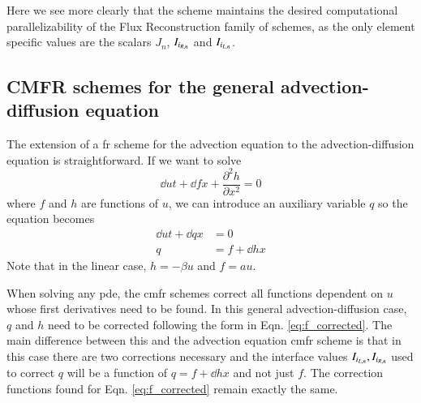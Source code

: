 Here we see more clearly that the scheme maintains the desired computational parallelizability of the Flux Reconstruction family of schemes, as the only element specific values are the scalars $J_n$, ${I_{i_{R,n}}}$ and ${I_{i_{L,n}}}$.

\subsection{CMFR schemes for the general advection-diffusion equation}
The extension of a \gls{fr} scheme for the advection equation to the advection-diffusion equation is straightforward. If we want to solve
\begin{equation}
\label{eq:adv_diff}
\dd{u}{t} + \dd{f}{x} + \frac{\partial ^2 h}{\partial x^2}= 0 
\end{equation}
where $f$ and $h$ are functions of $u$, we can introduce an auxiliary variable $q$ so the equation becomes
\begin{equation}
\begin{split}
\dd{u}{t} + \dd{q}{x} &= 0\\
q &= f + \dd{h}{x} 
\end{split}
\end{equation}
Note that in the linear case, $h = -\beta u$ and $f = a u$.


When solving any \gls{pde}, the \gls{cmfr} schemes correct all functions dependent on $u$ whose first derivatives need to be found. In this general advection-diffusion case, $q$ and $h$ need to be corrected following the form in Eqn. \eqref{eq:f_corrected}. The main difference between this and the advection equation \gls{cmfr} scheme is that in this case there are two corrections necessary and the interface values ${I_{i_{L,n}}},{I_{i_{R,n}}}$ used to correct $q$ will be a function of $q = f + \dd{h}{x}$ and not just $f$. The correction functions found for Eqn. \eqref{eq:f_corrected} remain exactly the same.